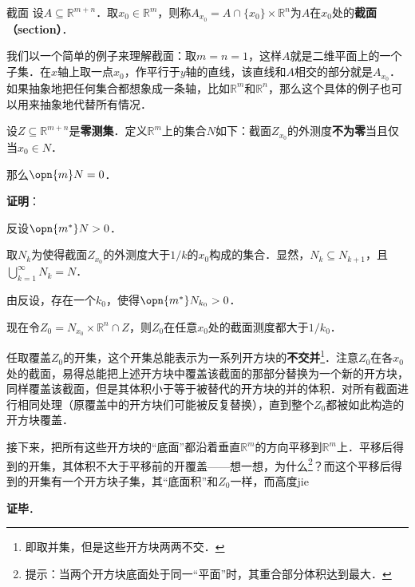 \begin{definition}{截面}
设$A\subseteq\mathbb{R}^{m+n}$．取$x_0\in \mathbb{R}^m$，则称$A_{x_0}=A\cap \{x_0\}\times \mathbb{R}^n$为$A$在$x_0$处的\textbf{截面（section）}．
\end{definition}

我们以一个简单的例子来理解截面：取$m=n=1$，这样$A$就是二维平面上的一个子集．在$x$轴上取一点$x_0$，作平行于$y$轴的直线，该直线和$A$相交的部分就是$A_{x_0}$．如果抽象地把任何集合都想象成一条轴，比如$\mathbb{R}^m$和$\mathbb{R}^n$，那么这个具体的例子也可以用来抽象地代替所有情况．

\begin{theorem}{}
设$Z\subseteq \mathbb{R}^{m+n}$是\textbf{零测集}．定义$\mathbb{R}^m$上的集合$N$如下：截面$Z_{x_0}$的外测度\textbf{不为零}当且仅当$x_0\in N$．

那么$\opn{m}N=0$．
\end{theorem}

\textbf{证明}：

反设$\opn{m^*}N>0$．

取$N_k$为使得截面$Z_{x_0}$的外测度大于$1/k$的$x_0$构成的集合．显然，$N_k\subseteq N_{k+1}$，且$\bigcup_{k=1}^\infty N_k=N$．

由反设，存在一个$k_0$，使得$\opn{m^*}N_{k_0}>0$．

现在令$Z_0=N_{x_0}\times\mathbb{R}^n \cap Z$，则$Z_0$在任意$x_0$处的截面测度都大于$1/k_0$．

任取覆盖$Z_0$的开集，这个开集总能表示为一系列开方块的\textbf{不交并}\footnote{即取并集，但是这些开方块两两不交．}．注意$Z_0$在各$x_0$处的截面，易得总能把上述开方块中覆盖该截面的那部分替换为一个新的开方块，同样覆盖该截面，但是其体积小于等于被替代的开方块的并的体积．对所有截面进行相同处理（原覆盖中的开方块们可能被反复替换），直到整个$Z_0$都被如此构造的开方块覆盖．

接下来，把所有这些开方块的“底面”都沿着垂直$\mathbb{R}^m$的方向平移到$\mathbb{R}^m$上．平移后得到的开集，其体积不大于平移前的开覆盖——想一想，为什么\footnote{提示：当两个开方块底面处于同一“平面”时，其重合部分体积达到最大．}？而这个平移后得到的开集有一个开方块子集，其“底面积”和$Z_0$一样，而高度jie



\textbf{证毕}．
















